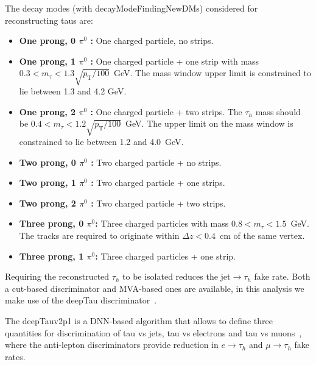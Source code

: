 The decay modes (with decayModeFindingNewDMs) considered for reconstructing taus are:
\begin{itemize}
\item \textbf{One prong, 0 $\pi^0$ :} One charged particle, no strips.
\item \textbf{One prong, 1 $\pi^0$ :} One charged particle + one strip with mass $ 0.3 < m_{\tau} < 1.3 \sqrt{p_{\text{T}}/100}$~GeV. The mass window upper limit is constrained to lie between 1.3 and 4.2 GeV.
\item \textbf{One prong, 2 $\pi^0$ :} One charged particle + two strips. The $\tau_{h}$ mass should be $0.4 < m_{\tau} < 1.2\sqrt{p_{\text{T}}/100}$~GeV. The upper limit on the mass window is constrained to lie between 1.2 and 4.0~GeV.
\item \textbf{Two prong, 0 $\pi^0$ :} Two charged particle + no strips.
\item \textbf{Two prong, 1 $\pi^0$ :} Two charged particle + one strips.
\item \textbf{Two prong, 2 $\pi^0$ :} Two charged particle + two strips.
\item \textbf{Three prong, 0 $\pi^0$: } Three charged particles with mass $0.8 < m_{\tau} < 1.5$~GeV. The tracks are required to originate within $\Delta z<0.4$~cm of the same vertex.
\item \textbf{Three prong, 1 $\pi^0$: } Three charged particles + one strip.
\end{itemize}

Requiring the reconstructed $\tau_{h}$ to be isolated reduces the
jet$\rightarrow\tau_{h}$ fake rate. Both a cut-based discriminator and  MVA-based
ones are available, in this analysis we make use of the deepTau discriminator~\cite{CMS-DP-2019-033}.

The deepTauv2p1 is a DNN-based algorithm that allows to define three quantities for discrimination of tau vs jets, tau vs electrons and tau vs muons~\cite{TauPOG}, where the anti-lepton discriminators provide reduction in $e\rightarrow\tau_h$ and $\mu\rightarrow\tau_h$ fake rates. 


